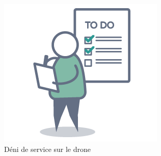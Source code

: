 \begin{figure}[H]
  \centering
  \includegraphics[scale=0.35]{images/todo}
  \caption{Déni de service sur le drone}
\end{figure}
